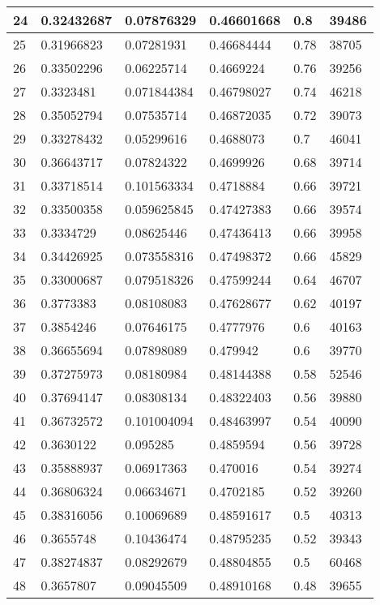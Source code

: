 \begin{longtable}{|l|l|l|l|l|l|}
24 & 0.32432687 & 0.07876329 & 0.46601668 & 0.8 & 39486 \\ \hline 
25 & 0.31966823 & 0.07281931 & 0.46684444 & 0.78 & 38705 \\ \hline 
26 & 0.33502296 & 0.06225714 & 0.4669224 & 0.76 & 39256 \\ \hline 
27 & 0.3323481 & 0.071844384 & 0.46798027 & 0.74 & 46218 \\ \hline 
28 & 0.35052794 & 0.07535714 & 0.46872035 & 0.72 & 39073 \\ \hline 
29 & 0.33278432 & 0.05299616 & 0.4688073 & 0.7 & 46041 \\ \hline 
30 & 0.36643717 & 0.07824322 & 0.4699926 & 0.68 & 39714 \\ \hline 
31 & 0.33718514 & 0.101563334 & 0.4718884 & 0.66 & 39721 \\ \hline 
32 & 0.33500358 & 0.059625845 & 0.47427383 & 0.66 & 39574 \\ \hline 
33 & 0.3334729 & 0.08625446 & 0.47436413 & 0.66 & 39958 \\ \hline 
34 & 0.34426925 & 0.073558316 & 0.47498372 & 0.66 & 45829 \\ \hline 
35 & 0.33000687 & 0.079518326 & 0.47599244 & 0.64 & 46707 \\ \hline 
36 & 0.3773383 & 0.08108083 & 0.47628677 & 0.62 & 40197 \\ \hline 
37 & 0.3854246 & 0.07646175 & 0.4777976 & 0.6 & 40163 \\ \hline 
38 & 0.36655694 & 0.07898089 & 0.479942 & 0.6 & 39770 \\ \hline 
39 & 0.37275973 & 0.08180984 & 0.48144388 & 0.58 & 52546 \\ \hline 
40 & 0.37694147 & 0.08308134 & 0.48322403 & 0.56 & 39880 \\ \hline 
41 & 0.36732572 & 0.101004094 & 0.48463997 & 0.54 & 40090 \\ \hline 
42 & 0.3630122 & 0.095285 & 0.4859594 & 0.56 & 39728 \\ \hline 
43 & 0.35888937 & 0.06917363 & 0.470016 & 0.54 & 39274 \\ \hline 
44 & 0.36806324 & 0.06634671 & 0.4702185 & 0.52 & 39260 \\ \hline 
45 & 0.38316056 & 0.10069689 & 0.48591617 & 0.5 & 40313 \\ \hline 
46 & 0.3655748 & 0.10436474 & 0.48795235 & 0.52 & 39343 \\ \hline 
47 & 0.38274837 & 0.08292679 & 0.48804855 & 0.5 & 60468 \\ \hline 
48 & 0.3657807 & 0.09045509 & 0.48910168 & 0.48 & 39655 \\ \hline 

\end{longtable}
